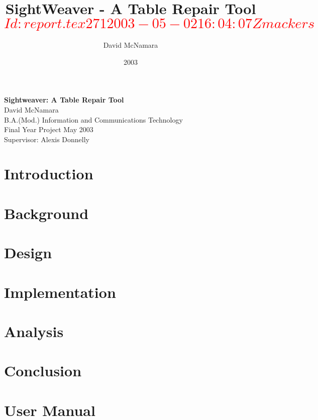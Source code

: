 \documentclass[a4paper,12pt]{report}
\title{SightWeaver - A Table Repair Tool
\\ \small \textcolor{red}{$Id: report.tex 271 2003-05-02 16:04:07Z mackers $}
}
\author{David McNamara}
\date{2003}
\newcommand{\strong}[1]{\textbf{#1}}
\begin{document}

\maketitle
\pagebreak

\vspace*{82mm}
\begin{center}
\strong{Sightweaver: A Table Repair Tool} \\
David McNamara \\
B.A.(Mod.) Information and Communications Technology \\
Final Year Project May 2003 \\
Supervisor: Alexis Donnelly 
\end{center}
\pagebreak


\pagebreak


\pagebreak

\tableofcontents
\pagebreak

\setlength{\parskip}{0.5em}


\chapter{Introduction}


\chapter{Background}


\chapter{Design}


\chapter{Implementation}


\chapter{Analysis}


\chapter{Conclusion}


\pagebreak
{}


\pagebreak

\appendix

\chapter{User Manual}


\end{document}
